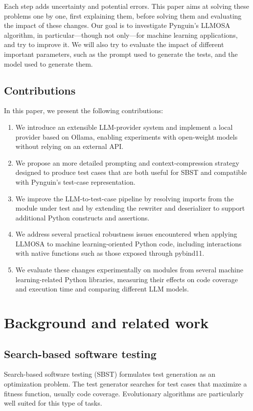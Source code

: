 \documentclass{article}
\begin{document}
Each step adds uncertainty and potential errors.
This paper aims at solving these problems one by one, first explaining them, before solving them and evaluating the impact of these changes. Our goal is to investigate Pynguin's LLMOSA algorithm, in particular---though not only---for machine learning applications, and try to improve it. We will also try to evaluate the impact of different important parameters, such as the prompt used to generate the tests, and the model used to generate them.


\subsection{Contributions}
In this paper, we present the following contributions:

\begin{enumerate}
\item We introduce an extensible LLM-provider system and implement a local provider based on Ollama, enabling experiments with open-weight models without relying on an external API.
\item We propose an more detailed prompting and context-compression strategy designed to produce test cases that are both useful for SBST and compatible with Pynguin's test-case representation.
\item We improve the LLM-to-test-case pipeline by resolving imports from the module under test and by extending the rewriter and deserializer to support additional Python constructs and assertions.
\item We address several practical robustness issues encountered when applying LLMOSA to machine learning-oriented Python code, including interactions with native functions such as those exposed through pybind11.
\item We evaluate these changes experimentally on modules from several machine learning-related Python libraries, measuring their effects on code coverage and execution time and comparing different LLM models.
\end{enumerate}


\section{Background and related work}\label{sec:background}

\subsection{Search-based software testing}
Search-based software testing (SBST) formulates test generation as an optimization problem. The test generator searches for test cases that maximize a fitness function, usually code coverage. Evolutionary algorithms are particularly well suited for this type of tasks.
\end{document}
